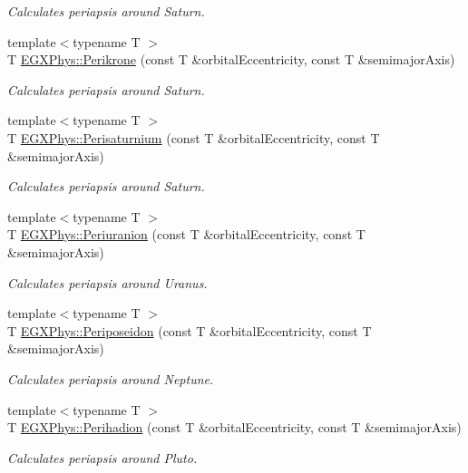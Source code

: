 \begin{DoxyCompactItemize}
\begin{DoxyCompactList}\small\item\em Calculates periapsis around Saturn. \end{DoxyCompactList}\item 
{\footnotesize template$<$typename T $>$ }\\T \hyperlink{group___astrophysics_gaa56f74c44a3583b8f0d13b821c1d7422}{E\+G\+X\+Phys\+::\+Perikrone} (const T \&orbital\+Eccentricity, const T \&semimajor\+Axis)
\begin{DoxyCompactList}\small\item\em Calculates periapsis around Saturn. \end{DoxyCompactList}\item 
{\footnotesize template$<$typename T $>$ }\\T \hyperlink{group___astrophysics_ga60a50d09d29ebe47cbbfc125c2ea42bf}{E\+G\+X\+Phys\+::\+Perisaturnium} (const T \&orbital\+Eccentricity, const T \&semimajor\+Axis)
\begin{DoxyCompactList}\small\item\em Calculates periapsis around Saturn. \end{DoxyCompactList}\item 
{\footnotesize template$<$typename T $>$ }\\T \hyperlink{group___astrophysics_gab8b8131a617dd2d2a4de1d48accd7442}{E\+G\+X\+Phys\+::\+Periuranion} (const T \&orbital\+Eccentricity, const T \&semimajor\+Axis)
\begin{DoxyCompactList}\small\item\em Calculates periapsis around Uranus. \end{DoxyCompactList}\item 
{\footnotesize template$<$typename T $>$ }\\T \hyperlink{group___astrophysics_ga237e7af3794202c67e65f64f4c8abc2a}{E\+G\+X\+Phys\+::\+Periposeidon} (const T \&orbital\+Eccentricity, const T \&semimajor\+Axis)
\begin{DoxyCompactList}\small\item\em Calculates periapsis around Neptune. \end{DoxyCompactList}\item 
{\footnotesize template$<$typename T $>$ }\\T \hyperlink{group___astrophysics_gafb16e46e55078b38604eef0d7c7c40c4}{E\+G\+X\+Phys\+::\+Perihadion} (const T \&orbital\+Eccentricity, const T \&semimajor\+Axis)
\begin{DoxyCompactList}\small\item\em Calculates periapsis around Pluto. \end{DoxyCompactList}\item 

\end{DoxyCompactItemize}
